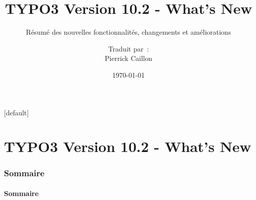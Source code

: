 \documentclass[t]{beamer}
\title{TYPO3 Version 10.2 - What's New}
\subtitle{Résumé des nouvelles fonctionnalités, changements et améliorations}
\author{
\centerline{Traduit par~:}
\centerline{Pierrick Caillon}
}
\date{\today}
\begin{document}
\sharefont


\begingroup
	[default]
	\begin{frame}
		\titlepage
	\end{frame}
\endgroup


\section*{TYPO3 Version 10.2 - What's New}
\begin{frame}[fragile]
	\frametitle{Sommaire}
	\framesubtitle{Sommaire}

	\tableofcontents

\end{frame}











%

\end{document}
